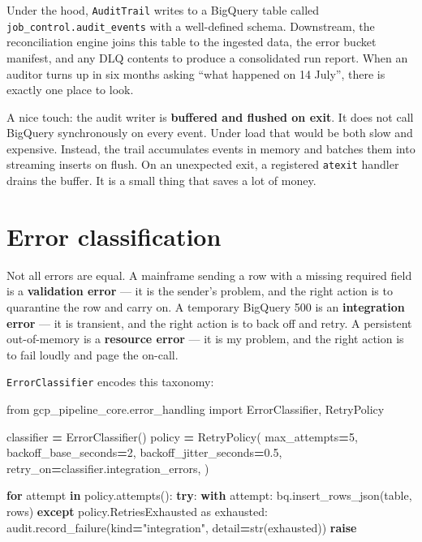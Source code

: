\documentclass[
  11pt,
  british,
  oneside]{book}
\newenvironment{Shaded}{\begin{snugshade}}{\end{snugshade}}
\newcommand{\BuiltInTok}[1]{#1}
\newcommand{\ControlFlowTok}[1]{\textcolor[rgb]{0.13,0.29,0.53}{\textbf{#1}}}
\newcommand{\DecValTok}[1]{\textcolor[rgb]{0.00,0.00,0.81}{#1}}
\newcommand{\FloatTok}[1]{\textcolor[rgb]{0.00,0.00,0.81}{#1}}
\newcommand{\ImportTok}[1]{#1}
\newcommand{\KeywordTok}[1]{\textcolor[rgb]{0.13,0.29,0.53}{\textbf{#1}}}
\newcommand{\NormalTok}[1]{#1}
\newcommand{\OperatorTok}[1]{\textcolor[rgb]{0.81,0.36,0.00}{\textbf{#1}}}
\newcommand{\StringTok}[1]{\textcolor[rgb]{0.31,0.60,0.02}{#1}}
\begin{document}
Under the hood, \texttt{AuditTrail} writes to a BigQuery table called
\texttt{job\_control.audit\_events} with a well-defined schema.
Downstream, the reconciliation engine joins this table to the ingested
data, the error bucket manifest, and any DLQ contents to produce a
consolidated run report. When an auditor turns up in six months asking
``what happened on 14 July'', there is exactly one place to look.

A nice touch: the audit writer is \textbf{buffered and flushed on exit}.
It does not call BigQuery synchronously on every event. Under load that
would be both slow and expensive. Instead, the trail accumulates events
in memory and batches them into streaming inserts on flush. On an
unexpected exit, a registered \texttt{atexit} handler drains the buffer.
It is a small thing that saves a lot of money.

\hypertarget{error-classification}{%
\section{Error classification}\label{error-classification}}

Not all errors are equal. A mainframe sending a row with a missing
required field is a \textbf{validation
error} --- it is the sender's
problem, and the right action is to quarantine the row and carry on. A
temporary BigQuery 500 is an \textbf{integration
error} --- it is transient, and
the right action is to back off and retry. A persistent out-of-memory is
a \textbf{resource error} --- it is
my problem, and the right action is to fail loudly and page the on-call.

\texttt{ErrorClassifier} encodes this taxonomy:

\begin{Shaded}
\begin{Highlighting}[]
\ImportTok{from}\NormalTok{ gcp\_pipeline\_core.error\_handling }\ImportTok{import}\NormalTok{ ErrorClassifier, RetryPolicy}

\NormalTok{classifier }\OperatorTok{=}\NormalTok{ ErrorClassifier()}
\NormalTok{policy }\OperatorTok{=}\NormalTok{ RetryPolicy(}
\NormalTok{    max\_attempts}\OperatorTok{=}\DecValTok{5}\NormalTok{,}
\NormalTok{    backoff\_base\_seconds}\OperatorTok{=}\DecValTok{2}\NormalTok{,}
\NormalTok{    backoff\_jitter\_seconds}\OperatorTok{=}\FloatTok{0.5}\NormalTok{,}
\NormalTok{    retry\_on}\OperatorTok{=}\NormalTok{classifier.integration\_errors,}
\NormalTok{)}

\ControlFlowTok{for}\NormalTok{ attempt }\KeywordTok{in}\NormalTok{ policy.attempts():}
    \ControlFlowTok{try}\NormalTok{:}
        \ControlFlowTok{with}\NormalTok{ attempt:}
\NormalTok{            bq.insert\_rows\_json(table, rows)}
    \ControlFlowTok{except}\NormalTok{ policy.RetriesExhausted }\ImportTok{as}\NormalTok{ exhausted:}
\NormalTok{        audit.record\_failure(kind}\OperatorTok{=}\StringTok{"integration"}\NormalTok{, detail}\OperatorTok{=}\BuiltInTok{str}\NormalTok{(exhausted))}
        \ControlFlowTok{raise}
\end{Highlighting}
\end{Shaded}
\end{document}
